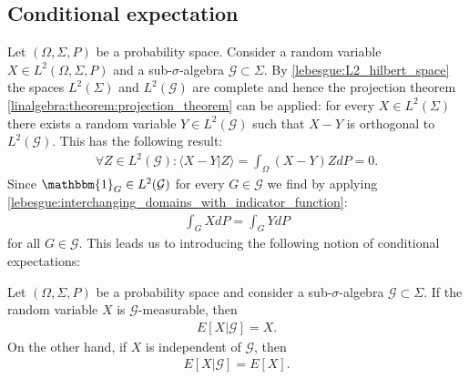 \subsection{Conditional expectation}

    Let $(\Omega,\Sigma,P)$ be a probability space. Consider a random variable $X\in L^2(\Omega,\Sigma,P)$ and a sub-$\sigma$-algebra $\mathcal{G}\subset\Sigma$. By \ref{lebesgue:L2_hilbert_space} the spaces $L^2(\Sigma)$ and $L^2(\mathcal{G})$ are complete and hence the projection theorem \ref{linalgebra:theorem:projection_theorem} can be applied: for every $X\in L^2(\Sigma)$ there exists a random variable $Y\in L^2(\mathcal{G})$ such that $X-Y$ is orthogonal to $L^2(\mathcal{G})$. This has the following result:
    \begin{gather}
        \forall Z\in L^2(\mathcal{G}):\langle X-Y|Z \rangle = \int_\Omega(X-Y)ZdP = 0.
    \end{gather}
    Since $\mathbbm{1}_G\in L^2(\mathcal{G})$ for every $G\in\mathcal{G}$ we find by applying \eqref{lebesgue:interchanging_domains_with_indicator_function}:
    \begin{gather}
        \label{prob:conditional_expectation_condition}
        \int_G XdP = \int_G YdP
    \end{gather}
    for all $G\in\mathcal{G}$. This leads us to introducing the following notion of conditional expectations:

    \begin{property}\label{prob:conditional_expectation_props}
        Let $(\Omega, \Sigma, P)$ be a probability space and consider a sub-$\sigma$-algebra $\mathcal{G}\subset\Sigma$. If the random variable $X$ is $\mathcal{G}$-measurable, then
        \begin{gather}
            E[X|\mathcal{G}] = X.
        \end{gather}
        On the other hand, if $X$ is independent of $\mathcal{G}$, then
        \begin{gather}
            E[X|\mathcal{G}] = E[X].
        \end{gather}
    \end{property}

